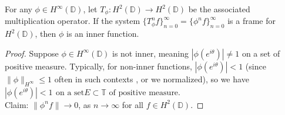 \documentclass[10pt,a4paper]{amsart}
\begin{document}
\begin{prop} \label{Prop.1}
For any $\phi \in H^{\infty}(\mathbb{D})$, let $T_{\phi}:
H^2(\mathbb{D})\rightarrow H^2(\mathbb{D})$ be the associated
multiplication operator. If the system
$\{T_{\phi}^nf\}_{n=0}^{\infty}=\{ \phi^n f \}_{n=0}^\infty $ is a
frame for $H^2(\mathbb{D})$, then $\phi$ is an inner function.
\end{prop}

\begin{proof}
Suppose $\phi \in H^\infty(\mathbb{D})$ is not inner, meaning
$|\phi(e^{i\theta})|\neq 1$ on a set of positive measure.
Typically, for non-inner functions, $|\phi(e^{i\theta})|<1$ (since
$\|\phi\|_{H^{\infty}}\leq 1$ often in such contexts , or we
normalized), so we have $|\phi(e^{i\theta})|<1 \,\ \text{on a set
} E
\subset \mathbb{T} \text{ of positive measure}$.\\
Claim: $\|\phi ^n f\| \rightarrow 0$, as $n \rightarrow \infty$
for all $f \in H^2(\mathbb{D})$.


\end{proof}
\end{document}
